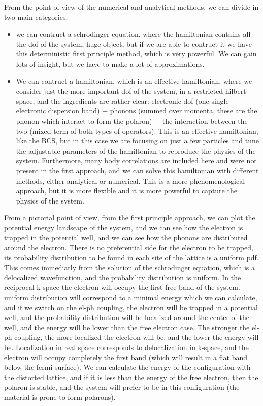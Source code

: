 From the point of view of the numerical and analytical methods, we can divide in two main categories:
\begin{itemize}
    \item we can contruct a schrodinger equation, where the hamiltonian contains all the dof of the system, huge object, but if we are able to contruct it we have this deterministic first principle method, which is very powerful. We can gain lots of insight, but we have to make a lot of approximations.
    \item We can contruct a hamiltonian, which is an effective hamiltonian, where we consider just the more important dof of the system, in a restricted hilbert space, and the ingredients are rather clear: electronic dof (one single electronic dispersion band) + phonons (summed over momenta, these are the phonon which interact to form the polaron) + the interaction between the two (mixed term of both types of operators). This is an effective hamiltonian, like the BCS, but in this case we are focusing on just a few particles and tune the adjustable parameters of the hamiltonian to reproduce the physics of the system. Furthermore, many body correlations are included here and were not present in the first approach, and we can solve this hamiltonian with different methods, either analytical or numerical. This is a more phenomenological approach, but it is more flexible and it is more powerful to capture the physics of the system.
\end{itemize}

From a pictorial point of view, from the first principle approach, we can plot the potential energy landscape of the system, and we can see how the electron is trapped in the potential well, and we can see how the phonons are distributed around the electron. There is no preferential side for the electron to be trapped, its probability distribution to be found in each site of the lattice is a uniform pdf. This comes immediatly from the solution of the schrodinger equation, which is a delocalized wavefunction, and the probability distribution is uniform.
In the reciprocal k-space the electron will occupy the first free band of the system.
uniform distribution will correspond to a minimal energy which we can calculate, and if we switch on the el-ph coupling, the electron will be trapped in a potential well, and the probability distribution will be localized around the center of the well, and the energy will be lower than the free electron case. The stronger the el-ph coupling, the more localized the electron will be, and the lower the energy will be. Localization in real space corresponds to delocalization in k-space, and the electron will occupy completely the first band (which will result in a flat band below the fermi surface).
We can calculate the energy of the configuration with the distorted lattice, and if it is less than the energy of the free electron, then the polaron is stable, and the system will prefer to be in this configuration (the material is prone to form polarons).

